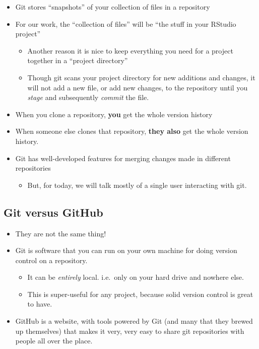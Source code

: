 \documentclass[]{book}
\providecommand{\tightlist}{%
  \setlength{\itemsep}{0pt}\setlength{\parskip}{0pt}}
\theoremstyle{definition}
\theoremstyle{definition}
\theoremstyle{remark}
\begin{document}
\begin{itemize}
\tightlist
\item
  Git stores ``snapshots'' of your collection of files in a repository
\item
  For our work, the ``collection of files'' will be ``the stuff in your
  RStudio project''

  \begin{itemize}
  \tightlist
  \item
    Another reason it is nice to keep everything you need for a project
    together in a ``project directory''
  \item
    Though git scans your project directory for new additions and
    changes, it will not add a new file, or add new changes, to the
    repository until you \emph{stage} and subsequently \emph{commit} the
    file.
  \end{itemize}
\item
  When you clone a repository, \textbf{you} get the whole version
  history
\item
  When someone else clones that repository, \textbf{they also} get the
  whole version history.
\item
  Git has well-developed features for merging changes made in different
  repositories

  \begin{itemize}
  \tightlist
  \item
    But, for today, we will talk mostly of a single user interacting
    with git.
  \end{itemize}
\end{itemize}

\subsection{Git versus GitHub}\label{git-versus-github}

\begin{itemize}
\tightlist
\item
  They are not the same thing!
\item
  Git is software that you can run on your own machine for doing version
  control on a repository.

  \begin{itemize}
  \tightlist
  \item
    It can be \emph{entirely} local. i.e.~only on your hard drive and
    nowhere else.
  \item
    This is super-useful for any project, because solid version control
    is great to have.
  \end{itemize}
\item
  GitHub is a website, with tools powered by Git (and many that they
  brewed up themselves) that makes it very, very easy to share git
  repositories with people all over the place.
\end{itemize}
\end{document}
